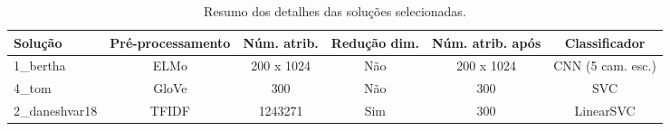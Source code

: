 \begin{table}[!thb]
    \centering
    \caption{Resumo dos detalhes das soluções selecionadas.}
    \begin{adjustbox}{max width={\textwidth},keepaspectratio}%
    \begin{tabular}{|l|c|c|c|c|c|}
        \hline
        \textbf{Solução}
        & \textbf{Pré-processamento} & \textbf{Núm. atrib.} & \textbf{Redução dim.} 
        & \textbf{Núm. atrib. após}  & \textbf{Classificador}
        \\ \hline
        1\_bertha        
        & ELMo          & 200 x 1024        & Não
        & 200 x 1024    & CNN (5 cam. esc.) 
        \\ \hline
        4\_tom
        & GloVe         & 300               & Não
        & 300           & SVC                
        \\ \hline
        2\_daneshvar18
        & TFIDF         & 1243271           & Sim
        & 300           & LinearSVC          
        \\ 
        \hline
    \end{tabular}
    \end{adjustbox}
    \label{tab:resumo-soluções} 
\end{table}
